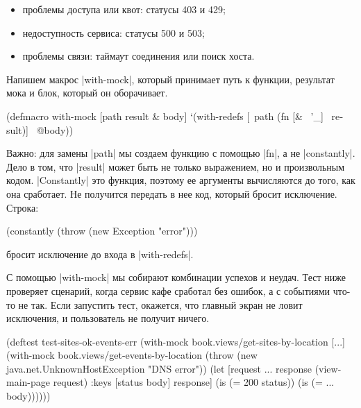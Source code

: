 \begin{itemize}

\item
  проблемы доступа или квот: статусы 403 и 429;

\item
  недоступность сервиса: статусы 500 и 503;

\item
  проблемы связи: таймаут соединения или поиск хоста.

\end{itemize}

Напишем макрос \spverb|with-mock|, который принимает путь к функции, результат
мока и блок, который он оборачивает.

\begin{english}
  \begin{clojure}
(defmacro with-mock
  [path result & body]
  `(with-redefs
     [~path (fn [& ~'_] ~result)]
     ~@body))
  \end{clojure}
\end{english}

Важно: для замены \spverb|path| мы создаем функцию с помощью \spverb|fn|, а не
\spverb|constantly|. Дело в том, что \spverb|result| может быть не только
выражением, но и произвольным кодом. \spverb|Constantly| это функция, поэтому ее
аргументы вычисляются до того, как она сработает. Не получится передать в нее
код, который бросит исключение. Строка:

\begin{english}
  \begin{clojure}
(constantly (throw (new Exception "error")))
  \end{clojure}
\end{english}

\noindent
бросит исключение до входа в \spverb|with-redefs|.

С помощью \spverb|with-mock| мы собирают комбинации успехов и неудач. Тест ниже
проверяет сценарий, когда сервис кафе сработал без ошибок, а с событиями что-то
не так. Если запустить тест, окажется, что главный экран не ловит исключения, и
пользователь не получит ничего.

\begin{english}
  \begin{clojure}
(deftest test-sites-ok-events-err
  (with-mock book.views/get-sites-by-location [...]
    (with-mock book.views/get-events-by-location
      (throw (new java.net.UnknownHostException "DNS error"))
      (let [request {...}
            response (view-main-page request)
            {:keys [status body]} response]
        (is (= 200 status))
        (is (= {...} body))))))
  \end{clojure}
\end{english}

